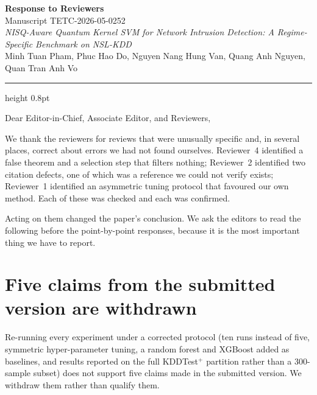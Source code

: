\documentclass[11pt,a4paper]{article}
\begin{document}
\begin{center}
  {\Large\bfseries Response to Reviewers}\\[4pt]
  {\normalsize Manuscript TETC-2026-05-0252}\\[2pt]
  {\normalsize\itshape NISQ-Aware Quantum Kernel SVM for Network Intrusion
   Detection: A Regime-Specific Benchmark on NSL-KDD}\\[6pt]
  {\normalsize Minh Tuan Pham, Phuc Hao Do, Nguyen Nang Hung Van,
   Quang Anh Nguyen, Quan Tran Anh Vo}
\end{center}

\vspace{6pt}
{\color{rulegray}\hrule height 0.8pt}
\vspace{10pt}

Dear Editor-in-Chief, Associate Editor, and Reviewers,

We thank the reviewers for reviews that were unusually specific and, in several
places, correct about errors we had not found ourselves. Reviewer~4 identified a
false theorem and a selection step that filters nothing; Reviewer~2 identified
two citation defects, one of which was a reference we could not verify exists;
Reviewer~1 identified an asymmetric tuning protocol that favoured our own
method. Each of these was checked and each was confirmed.

Acting on them changed the paper's conclusion. We ask the editors to read the
following before the point-by-point responses, because it is the most important
thing we have to report.

\section*{Five claims from the submitted version are withdrawn}

Re-running every experiment under a corrected protocol (ten runs instead of
five, symmetric hyper-parameter tuning, a random forest and XGBoost added as
baselines, and results reported on the full KDDTest$^{+}$ partition rather than
a 300-sample subset) does not support five claims made in the submitted
version. We withdraw them rather than qualify them.
\end{document}
